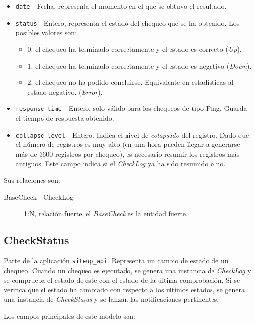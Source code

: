 \begin{itemize}
\item \texttt{date} - Fecha, representa el momento en el que se obtuvo el resultado.
\item \texttt{status} - Entero, representa el estado del chequeo que se ha
  obtenido. Los posibles valores son:
  \begin{itemize}
  \item 0: el chequeo ha terminado correctamente y el estado es correcto (\textit{Up}).
  \item 1: el chequeo ha terminado correctamente y el estado es negativo (\textit{Down}).
  \item 2: el chequeo no ha podido concluirse. Equivalente en estadísticas al estado negativo. (\textit{Error}).
  \end{itemize}
\item \texttt{response\_time} - Entero, solo válido para los chequeos de tipo
  Ping. Guarda el tiempo de respuesta obtenido.
\item \texttt{collapse\_level} - Entero. Indica el nivel de \textit{colapsado}
  del registro. Dado que el número de registros es muy alto (en una hora pueden
  llegar a generarse más de 3600 registros por chequeo), es necesario resumir
  los registros más antiguos. Este campo indica si el \textit{CheckLog} ya ha
  sido resumido o no.
\end{itemize}

Sus relaciones son:

\begin{description}
\item[BaseCheck - CheckLog] 1:N, relación fuerte, el \textit{BaseCheck} es la entidad fuerte.
\end{description}


\subsection{CheckStatus}

Parte de la aplicación \texttt{siteup\_api}. Representa un cambio de estado de
un chequeo. Cuando un chequeo es ejecutado, se genera una instancia de
\textit{CheckLog} y se comprueba el estado de éste con el estado de la última
comprobación. Si se verifica que el estado ha cambiado con respecto a los
últimos estados, se genera una instancia de \textit{CheckStatus} y se lanzan las
notificaciones pertinentes.

Los campos principales de este modelo son:

